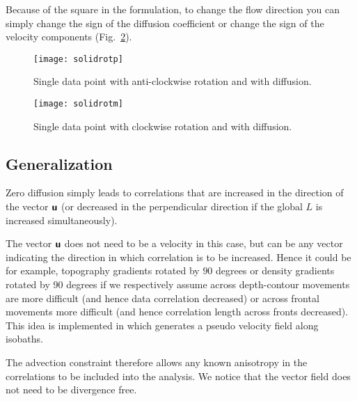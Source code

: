 Because of the square in the formulation, to change the flow direction 
you can simply change the sign of the diffusion coefficient or change 
the sign of the velocity components (Fig.~\ref{fig:solidrotm}).

\begin{figure}[htpb]
\parbox{.6\textwidth}{
\texttt{[image: solidrotp]}
}\parbox{.4\textwidth}{
\caption{Single data point with anti-clockwise rotation and with diffusion. \label{fig:solidrotp}}
}
\end{figure}

\begin{figure}[htpb]
\centering
\parbox{.6\textwidth}{
\texttt{[image: solidrotm]}
}\parbox{.4\textwidth}{
\caption{Single data point with clockwise rotation and with diffusion. \label{fig:solidrotm}}
}
\end{figure}


\subsection{Generalization}

Zero diffusion simply leads to correlations that are increased in the 
direction of the vector $\mbox{\boldmath $ \protect\mathsf{u} $}$ (or decreased in the perpendicular 
direction if the global $L$ is increased simultaneously). 

The vector $\mbox{\boldmath $ \protect\mathsf{u} $}$ does not need to be a velocity in this case, but can be any 
vector indicating the direction in which correlation is to be increased.
Hence it could be for example, topography gradients rotated by $90$ degrees 
or density gradients rotated by 90 degrees if we respectively assume across depth-contour movements are more 
difficult (and hence data correlation decreased) or across frontal movements more difficult (and hence correlation length 
across fronts decreased). This idea is implemented in  which generates a pseudo velocity field along isobaths.

The advection constraint therefore allows any known anisotropy in the correlations to be included into the analysis. We notice that the vector field does not need to be divergence free.



